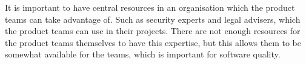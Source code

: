 It is important to have central resources in an organisation which the product teams can take advantage of. Such as security experts and legal advisers, which the product teams can use in their projects. There are not enough resources for the product teams themselves to have this expertise, but this allows them to be somewhat available for the teams, which is important for software quality.







